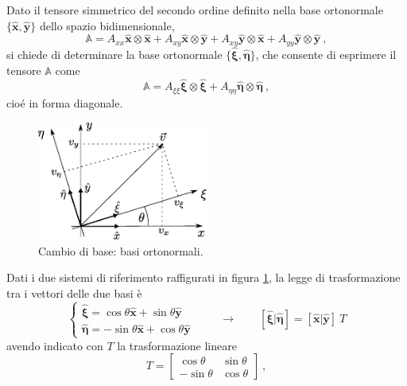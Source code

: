 \begin{exercise}
    Dato il tensore simmetrico del secondo ordine definito nella base ortonormale $\{\bm{\hat{x}}, \bm{\hat{y}}\}$ dello spazio bidimensionale,
\begin{equation}
    \mathbb{A} = A_{xx} \bm{\hat{x}} \otimes \bm{\hat{x}} +
                 A_{xy} \bm{\hat{x}} \otimes \bm{\hat{y}} +
                 A_{xy} \bm{\hat{y}} \otimes \bm{\hat{x}} +
                 A_{yy} \bm{\hat{y}} \otimes \bm{\hat{y}} \ ,
\end{equation}
 si chiede di determinare la base ortonormale $\{\bm{\hat{\xi}},\bm{\hat{\eta}}\}$, che consente di esprimere il tensore $\mathbb{A}$ come 
\begin{equation}
    \mathbb{A} = A_{\xi \xi } \bm{\hat{\xi }} \otimes \bm{\hat{\xi }} +
                 A_{\eta\eta} \bm{\hat{\eta}} \otimes \bm{\hat{\eta}} \ , 
\end{equation}
cioé in forma diagonale.
\end{exercise}
%
\begin{figure}[h]
 \centering
 \includegraphics[width=0.5\textwidth]{./fig/rotation}
    \caption{Cambio di base: basi ortonormali.}\label{fig:tensor:rotation}
\end{figure}
Dati i due sistemi di riferimento raffigurati in figura \ref{fig:tensor:rotation}, la legge di trasformazione tra i vettori delle due basi è
\begin{equation}
 \begin{cases}
   \bm{\hat{\xi}} =  \cos{\theta} \bm{\hat{x}} + \sin{\theta} \bm{\hat{y}} \\
   \bm{\hat{\eta}} = -\sin{\theta} \bm{\hat{x}} + \cos{\theta} \bm{\hat{y}} \
 \end{cases} \qquad \rightarrow \qquad
    [ \bm{\hat{\xi}} | \bm{\hat{\eta}} ] = [ \bm{\hat{x}} | \bm{\hat{y}} ] \ T
\end{equation}
avendo indicato con $T$ la trasformazione lineare
\begin{equation}
 T = 
\begin{bmatrix}
 \cos{\theta} & \sin{\theta} \\
-\sin{\theta} & \cos{\theta} 
\end{bmatrix} \ ,
\end{equation}
